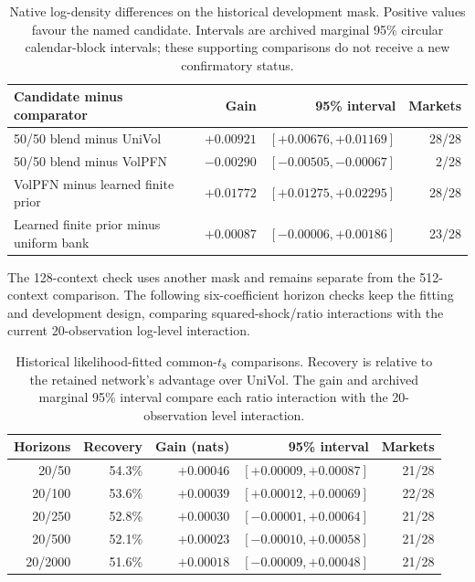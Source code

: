\begin{table}[htbp]
\centering\small
\caption[Historical blend and finite-prior checks]{Native log-density differences on the historical development mask. Positive values favour the named candidate. Intervals are archived marginal 95\% circular calendar-block intervals; these supporting comparisons do not receive a new confirmatory status.}
\label{tab:alternative-checks}
\begin{tabular}{p{}rrr}
\toprule
Candidate minus comparator & Gain & 95\% interval & Markets \\
\midrule
50/50 blend minus UniVol & $+0.00921$ & $[+0.00676,+0.01169]$ & 28/28 \\
50/50 blend minus VolPFN & $-0.00290$ & $[-0.00505,-0.00067]$ & 2/28 \\
VolPFN minus learned finite prior & $+0.01772$ & $[+0.01275,+0.02295]$ & 28/28 \\
Learned finite prior minus uniform bank & $+0.00087$ & $[-0.00006,+0.00186]$ & 23/28 \\
\bottomrule
\end{tabular}
\end{table}

The 128-context check uses another mask and remains separate from the 512-context comparison. The following six-coefficient horizon checks keep the fitting and development design, comparing squared-shock/ratio interactions with the current 20-observation log-level interaction.

\begin{table}[htbp]
\centering\small
\caption[The recorded horizon-sensitivity family]{Historical likelihood-fitted common-$t_8$ comparisons. Recovery is relative to the retained network's advantage over UniVol. The gain and archived marginal 95\% interval compare each ratio interaction with the 20-observation level interaction.}
\label{tab:horizon-support}
\begin{tabular}{rrrrr}
\toprule
Horizons & Recovery & Gain (nats) & 95\% interval & Markets \\
\midrule
20/50 & 54.3\% & $+0.00046$ & $[+0.00009,+0.00087]$ & 21/28 \\
20/100 & 53.6\% & $+0.00039$ & $[+0.00012,+0.00069]$ & 22/28 \\
20/250 & 52.8\% & $+0.00030$ & $[-0.00001,+0.00064]$ & 21/28 \\
20/500 & 52.1\% & $+0.00023$ & $[-0.00010,+0.00058]$ & 21/28 \\
20/2000 & 51.6\% & $+0.00018$ & $[-0.00009,+0.00048]$ & 21/28 \\
\bottomrule
\end{tabular}
\end{table}

